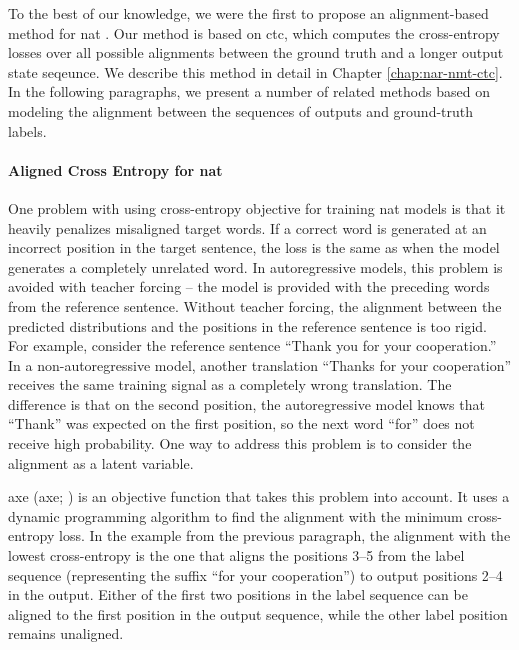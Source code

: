 To the best of our knowledge, we were the first to propose an alignment-based
method for \ac{nat} \citep{libovicky-helcl-2018-end}. Our method is based on
\acf{ctc}, which computes the cross-entropy losses over all
possible alignments between the ground truth and a longer output state
seqeunce. We describe this method in detail in Chapter \ref{chap:nar-nmt-ctc}.
In the following paragraphs, we present a number of related methods based on
modeling the alignment between the sequences of outputs and ground-truth
labels.

\paragraph{Aligned Cross Entropy for \ac{nat}} One problem with using
cross-entropy objective for training \ac{nat} models is that it heavily
penalizes misaligned target words. If a correct word is generated at an
incorrect position in the target sentence, the loss is the same as when the
model generates a completely unrelated word. In autoregressive models, this
problem is avoided with teacher forcing -- the model is provided with the
preceding words from the reference sentence. Without teacher forcing, the
alignment between the predicted distributions and the positions in the
reference sentence is too rigid. For example, consider the reference sentence
``Thank you for your cooperation.'' In a non-autoregressive model, another
translation ``Thanks for your cooperation'' receives the same training signal
as a completely wrong translation. The difference is that on the second
position, the autoregressive model knows that ``Thank'' was expected on the
first position, so the next word ``for'' does not receive high probability.
One way to address this problem is to consider the alignment as a latent
variable.

\Acl{axe}  (\acs{axe}; \citealp{ghazvininejad2020aligned}) is an
objective function that takes this problem into account. It uses a dynamic
programming algorithm to find the alignment with the minimum cross-entropy
loss. In the example from the previous paragraph, the alignment with the lowest
cross-entropy is the one that aligns the positions 3--5 from the label sequence
(representing the suffix ``for your cooperation'') to output positions 2--4 in
the output. Either of the first two positions in the label sequence can be
aligned to the first position in the output sequence, while the other label
position remains unaligned.

